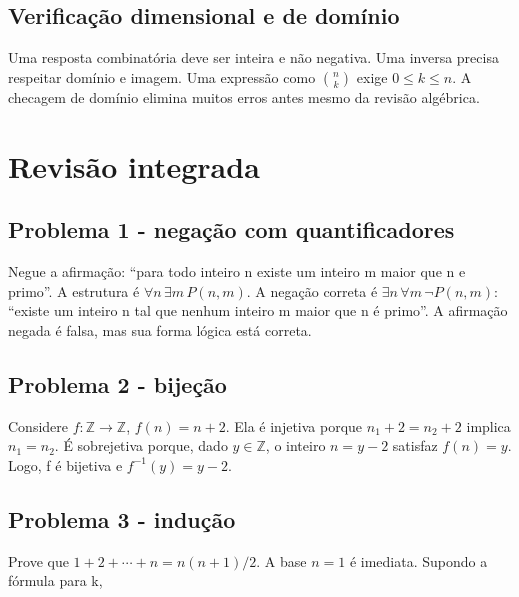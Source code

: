 \documentclass[12pt,a4paper,openany]{book}
\begin{document}
\section{Verificação dimensional e de domínio}



Uma resposta combinatória deve ser inteira e não negativa. Uma inversa precisa respeitar domínio e imagem. Uma expressão como $\binom{n}{k}$ exige $0\leq k\leq n$. A checagem de domínio elimina muitos erros antes mesmo da revisão algébrica.



\chapter{Revisão integrada}



\section{Problema 1 - negação com quantificadores}



Negue a afirmação: “para todo inteiro n existe um inteiro m maior que n e primo”. A estrutura é $\forall n\,\exists m\,P(n,m)$. A negação correta é $\exists n\,\forall m\,\neg P(n,m)$: “existe um inteiro n tal que nenhum inteiro m maior que n é primo”. A afirmação negada é falsa, mas sua forma lógica está correta.



\section{Problema 2 - bijeção}



Considere $f:\mathbb{Z}\to\mathbb{Z}$, $f(n)=n+2$. Ela é injetiva porque $n_1+2=n_2+2$ implica $n_1=n_2$. É sobrejetiva porque, dado $y\in\mathbb{Z}$, o inteiro $n=y-2$ satisfaz $f(n)=y$. Logo, f é bijetiva e $f^{-1}(y)=y-2$.



\section{Problema 3 - indução}



Prove que $1+2+\cdots+n=n(n+1)/2$. A base $n=1$ é imediata. Supondo a fórmula para k,
\end{document}
